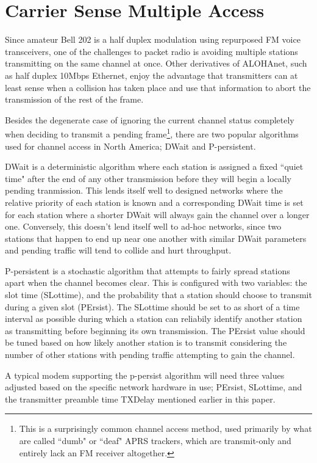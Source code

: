 \documentclass[12pt,letterpaper]{article}
\begin{document}
\section{Carrier Sense Multiple Access}
\label{sec:bell202csma}

Since amateur Bell 202 is a half duplex modulation using repurposed 
FM voice transceivers, 
one of the challenges to packet radio is avoiding multiple stations
transmitting on the same channel at once. 
Other derivatives of ALOHAnet, 
such as half duplex 10Mbps Ethernet, 
enjoy the advantage that transmitters can
at least sense when a collision has taken place 
and use that information to abort the transmission of the rest of the frame.

Besides the degenerate case of ignoring the current channel status completely when 
deciding to transmit a pending frame\footnote{This is a surprisingly
	common channel access method, used primarily by what are called ``dumb" or
	``deaf" APRS trackers, which are transmit-only and entirely lack an
FM receiver altogether.}, there are two popular algorithms used for
channel access in North America;
DWait and P-persistent.

DWait is a deterministic algorithm where each station is assigned a fixed
``quiet time" after the end of any other transmission 
before they will begin a locally pending tranmission. 
This lends itself well to designed networks
where the relative priority of each station is known and a corresponding DWait time
is set for each station where a shorter DWait will 
always gain the channel over a longer one. 
Conversely, this doesn't lend itself well to ad-hoc networks, since
two stations that happen to end up near one another with similar DWait parameters
and pending traffic will tend to collide and hurt throughput.

P-persistent is a stochastic algorithm that attempts to fairly spread
stations apart when the channel becomes clear. 
This is configured with two variables: the slot time (SLottime), and the
probability that a station should choose to transmit during a given slot (PErsist). 
The SLottime
should be set to as short of a time interval as possible during which a station can
reliabily identify another station as transmitting 
before beginning its own transmission.
The PErsist value should be tuned based on how likely another station is to transmit 
considering the number of other stations with 
pending traffic attempting to gain the channel.

A typical modem supporting the p-persist algorithm will need three values adjusted
based on the specific network hardware in use; PErsist, SLottime, and the 
transmitter preamble time TXDelay mentioned earlier in this paper.
\end{document}
